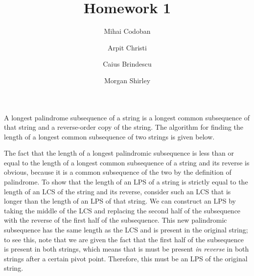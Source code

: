 \documentclass{article}
\title{Homework 1}
\author{Mihai Codoban \and Arpit Christi \and Caius Brindescu \and Morgan Shirley}
\begin{document}
\maketitle





A longest palindrome subsequence of a string is a longest common subsequence of that string and a reverse-order copy of the string. The algorithm for finding the length of a longest common subsequence of two strings is given below.



The fact that the length of a longest palindromic subsequence is less than or equal to the length of a longest common subsequence of a string and its reverse is obvious, because it is a common subsequence of the two by the definition of palindrome. To show that the length of an LPS of a string is strictly equal to the length of an LCS of the string and its reverse, consider such an LCS that is longer than the length of an LPS of that string. We can construct an LPS by taking the middle of the LCS and replacing the second half of the subsequence with the reverse of the first half of the subsequence. This new palindromic subsequence has the same length as the LCS and is present in the original string; to see this, note that we are given the fact that the first half of the subsequence is present in both strings, which means that is must be present \emph{in reverse} in both strings after a certain pivot point. Therefore, this must be an LPS of the original string.

\end{document}
